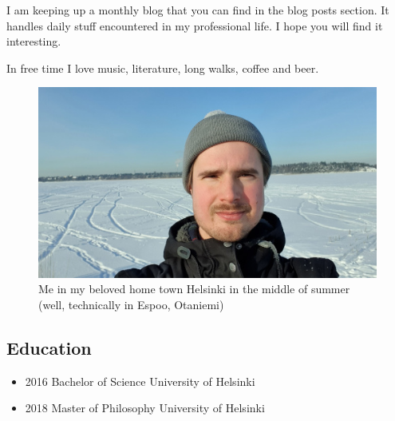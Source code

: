 \documentclass{article}
\begin{document}




I am keeping up a monthly blog that you can find in the blog posts section. It handles daily stuff encountered in my professional life. I hope you will find it interesting. 

In free time I love music, literature, long walks, coffee and beer.
 

\begin{figure}
  \includegraphics[width=\linewidth]{me1.jpg}
  \caption{Me in my beloved home town Helsinki in the middle of summer (well, technically in Espoo, Otaniemi)}
\end{figure}

\subsection{Education}
\begin{itemize}
\item 2016 Bachelor of Science University of Helsinki\\
\item 2018 Master of Philosophy University of Helsinki
\end{itemize}
\end{document}
